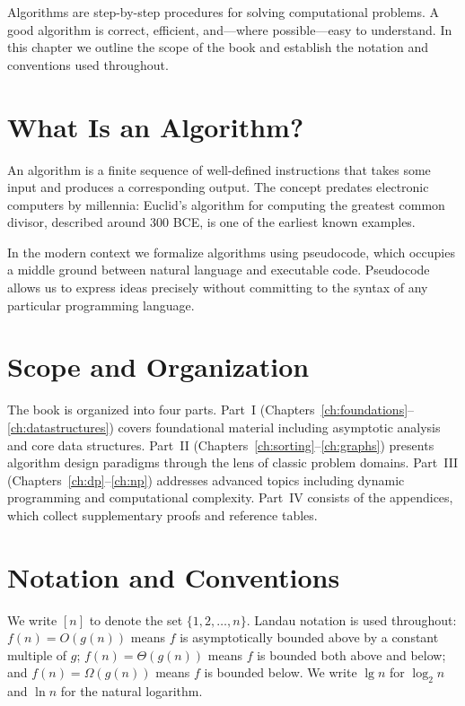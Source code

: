 \documentclass[
    language=english,
    doctype=book,
    institution=none,
    titlestyle=book
]{../../omnilatex}
\begin{document}
Algorithms are step-by-step procedures for solving computational problems. A good algorithm is correct, efficient, and---where possible---easy to understand. In this chapter we outline the scope of the book and establish the notation and conventions used throughout.

\section{What Is an Algorithm?}

An algorithm is a finite sequence of well-defined instructions that takes some input and produces a corresponding output. The concept predates electronic computers by millennia: Euclid's algorithm for computing the greatest common divisor, described around 300 BCE, is one of the earliest known examples.

In the modern context we formalize algorithms using pseudocode, which occupies a middle ground between natural language and executable code. Pseudocode allows us to express ideas precisely without committing to the syntax of any particular programming language.

\section{Scope and Organization}

The book is organized into four parts. Part~I (Chapters~\ref{ch:foundations}--\ref{ch:datastructures}) covers foundational material including asymptotic analysis and core data structures. Part~II (Chapters~\ref{ch:sorting}--\ref{ch:graphs}) presents algorithm design paradigms through the lens of classic problem domains. Part~III (Chapters~\ref{ch:dp}--\ref{ch:np}) addresses advanced topics including dynamic programming and computational complexity. Part~IV consists of the appendices, which collect supplementary proofs and reference tables.

\section{Notation and Conventions}

We write $[n]$ to denote the set $\{1, 2, \dots, n\}$. Landau notation is used throughout: $f(n) = O(g(n))$ means $f$ is asymptotically bounded above by a constant multiple of $g$; $f(n) = \Theta(g(n))$ means $f$ is bounded both above and below; and $f(n) = \Omega(g(n))$ means $f$ is bounded below. We write $\lg n$ for $\log_2 n$ and $\ln n$ for the natural logarithm.
\end{document}
